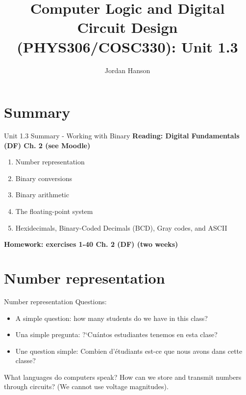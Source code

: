 \documentclass{beamer}
\title{Computer Logic and Digital Circuit Design (PHYS306/COSC330): Unit 1.3}
\author{Jordan Hanson}
\institute{Whittier College Department of Physics and Astronomy}
\begin{document}
\maketitle

\section{Summary}

\begin{frame}{Unit 1.3 Summary - Working with Binary}
\textbf{Reading: Digital Fundamentals (DF) Ch. 2 (see Moodle)}
\begin{enumerate}
\item Number representation
\item Binary conversions
\item Binary arithmetic
\item The floating-point system
\item Hexidecimals, Binary-Coded Decimals (BCD), Gray codes, and ASCII
\end{enumerate}
\textbf{Homework: exercises 1-40 Ch. 2 (DF) (two weeks)}
\end{frame}

\section{Number representation}

\begin{frame}{Number representation}
Questions:
\begin{itemize}
\item A simple question: how many students do we have in this class? \\
\item Una simple pregunta: ?`Cu\'{a}ntos estudiantes tenemos en esta clase? \\
\item Une question simple: Combien d'\'{e}tudiants est-ce que nous avons dans cette classe?
\end{itemize}
What languages do computers speak?  How can we store and transmit numbers through circuits?  (We cannot use voltage magnitudes).
\end{frame}
\end{document}
